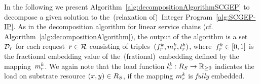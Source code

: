 \documentclass[10pt, conference, letterpaper]{IEEEtran}
\begin{document}
In the following we present Algorithm~\ref{alg:decompositionAlgorithmSCGEP} to decompose a given solution to the~(relaxation of)~Integer Program~\ref{alg:SCGEP-IP}. As in the decomposition algorithm for linear service chains (cf. Algorithm~\ref{alg:decompositionAlgorithm}), the output of the algorithm is a set~$\mathcal{D}_{r}$ for each request~$r \in \mathcal{R}$ consisting of triples~$(\prob,\mapping,\load)$, where~$\prob \in [0,1]$ is the fractional embedding value of the~(frational)~embedding defined by the mapping~$\mapping$. We again note that the load function $\load: \SR \to \preals$ indicates the load on substrate resource $(x,y) \in  R_{S}$, if the mapping $\mapping$ is \emph{fully} embedded.



\begin{figure}

\end{figure}
\end{document}
